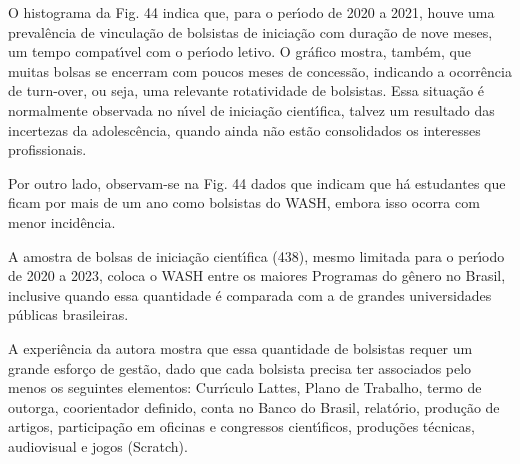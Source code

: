 \documentclass[
12pt,		%
openright,	%
twoside,  %
a4paper,			%
chapter=TITLE,		%
english,			%
french,				%
spanish,			%
brazil				%
]{USPSC-classe/USPSC}
\begin{document}
O histograma da Fig. 44 indica que, para o per\'{\i}odo de 2020 a 2021, houve uma preval\^encia de vincula\c{c}\~ao de bolsistas de inicia\c{c}\~ao com dura\c{c}\~ao de nove meses, um tempo compat\'{\i}vel com o per\'{\i}odo letivo. O gr\'afico mostra, tamb\'em, que muitas bolsas se encerram com poucos meses de concess\~ao, indicando a ocorr\^encia de \textquotedbl turn-over\textquotedbl , ou seja, uma relevante rotatividade de bolsistas. Essa situa\c{c}\~ao \'e normalmente observada no n\'{\i}vel de inicia\c{c}\~ao cient\'{\i}fica, talvez um resultado das incertezas da adolesc\^encia, quando ainda n\~ao est\~ao consolidados os interesses profissionais.

















Por outro lado, observam-se na Fig. 44 dados que indicam que h\'a estudantes que ficam por mais de um ano como bolsistas do WASH, embora isso ocorra com menor incid\^encia.

















A amostra de bolsas de inicia\c{c}\~ao cient\'{\i}fica (438), mesmo limitada para o per\'{\i}odo de 2020 a 2023, coloca o WASH entre os maiores Programas do g\^enero no Brasil, inclusive quando essa quantidade \'e comparada com a de grandes universidades p\'ublicas brasileiras.

















A experi\^encia da autora mostra que essa quantidade de bolsistas requer um grande esfor\c{c}o de gest\~ao, dado que cada bolsista precisa ter associados pelo menos os seguintes elementos: Curr\'{\i}culo Lattes, Plano de Trabalho, termo de outorga, coorientador definido, conta no Banco do Brasil, relat\'orio, produ\c{c}\~ao de artigos, participa\c{c}\~ao em oficinas e congressos cient\'{\i}ficos, produ\c{c}\~oes t\'ecnicas, audiovisual e jogos (Scratch).
\end{document}
